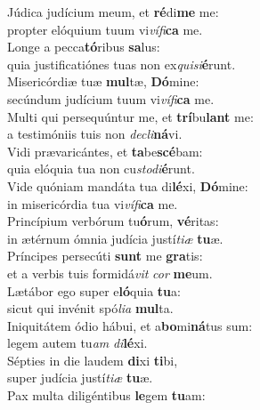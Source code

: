 \evenverse Júdica judícium meum, et \textbf{ré}di\textbf{me} me:~\*\\
\evenverse propter elóquium tuum vi\textit{ví}\textit{fi}\textbf{ca} me.\\
\oddverse Longe a pecca\textbf{tó}ribus \textbf{sa}lus:~\*\\
\oddverse quia justificatiónes tuas non ex\textit{qui}\textit{si}\textbf{é}runt.\\
\evenverse Misericórdiæ tuæ \textbf{mul}tæ, \textbf{Dó}mine:~\*\\
\evenverse secúndum judícium tuum vi\textit{ví}\textit{fi}\textbf{ca} me.\\
\oddverse Multi qui persequúntur me, et \textbf{trí}bu\textbf{lant} me:~\*\\
\oddverse a testimóniis tuis non \textit{de}\textit{cli}\textbf{ná}vi.\\
\evenverse Vidi prævaricántes, et \textbf{ta}be\textbf{scé}bam:~\*\\
\evenverse quia elóquia tua non cu\textit{sto}\textit{di}\textbf{é}runt.\\
\oddverse Vide quóniam mandáta tua di\textbf{lé}xi, \textbf{Dó}mine:~\*\\
\oddverse in misericórdia tua vi\textit{ví}\textit{fi}\textbf{ca} me.\\
\evenverse Princípium verbórum tu\textbf{ó}rum, \textbf{vé}ritas:~\*\\
\evenverse in ætérnum ómnia judícia justí\textit{ti}\textit{æ} \textbf{tu}æ.\\
\oddverse Príncipes persecúti \textbf{sunt} me \textbf{gra}tis:~\*\\
\oddverse et a verbis tuis formidá\textit{vit} \textit{cor} \textbf{me}um.\\
\evenverse Lætábor ego super e\textbf{ló}quia \textbf{tu}a:~\*\\
\evenverse sicut qui invénit spó\textit{li}\textit{a} \textbf{mul}ta.\\
\oddverse Iniquitátem ódio hábui, et a\textbf{bo}mi\textbf{ná}tus sum:~\*\\
\oddverse legem autem tu\textit{am} \textit{di}\textbf{lé}xi.\\
\evenverse Sépties in die laudem \textbf{di}xi \textbf{ti}bi,~\*\\
\evenverse super judícia justí\textit{ti}\textit{æ} \textbf{tu}æ.\\
\oddverse Pax multa diligéntibus \textbf{le}gem \textbf{tu}am:~\*\\
